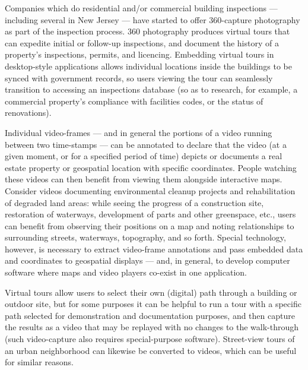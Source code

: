 \documentclass[10.5pt]{article}
\begin{document}
{

\begin{description}[leftmargin=3pt, itemsep=-1pt]

\item[Building Inspections]  Companies which do residential and/or commercial building inspections 
--- including several in New Jersey --- have started to offer 360-capture photography as part of the 
inspection process.  360\textdegree{} photography produces virtual tours that can expedite 
initial or follow-up inspections, and document the history of a property's inspections, permits, and 
licencing.  Embedding virtual tours in desktop-style applications allows individual locations inside 
the buildings to be synced with government records, so users viewing the tour can seamlessly transition 
to accessing an inspections database (so as to research, for example, a commercial property's 
compliance with facilities codes, or the status of renovations). 

\item[Geotagging Videos]  Individual video-frames --- and in general the portions of a video 
running between two time-stamps --- can be annotated to declare that the 
video (at a given moment, or for a specified period of time) depicts or documents a real estate property or 
geospatial location with specific \GIS{} coordinates.  People watching 
these videos can then benefit from viewing them alongside interactive \GIS{} maps.  
Consider videos documenting environmental cleanup 
projects and rehabilitation of degraded land areas: while seeing the 
progress of a construction site, restoration of waterways, development of parts and 
other greenspace, etc., users can benefit from observing their positions on a 
map and noting relationships to surrounding streets, waterways, topography, and so forth. 
Special technology, however, is necessary to extract video-frame annotations and 
pass embedded \GIS{} data and coordinates to geospatial displays --- and, in general, 
to develop computer software where \GIS{} maps and video players co-exist in one application.    

\item[Converting street-view or virtual tours to video]  Virtual tours allow users 
to select their own (digital) path through a building or outdoor site, but for some purposes 
it can be helpful to run a tour with a specific path selected for demonstration and 
documentation purposes, and then capture the results as a video that may be 
replayed with no changes to the walk-through 
(such video-capture also requires special-purpose software).  Street-view 
tours of an urban neighborhood can likewise be converted to videos, which 
can be useful for similar reasons. 


\end{description}}
\end{document}
